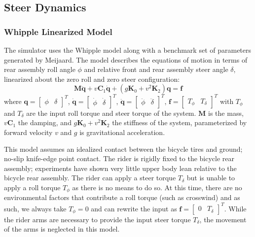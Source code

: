 \documentclass[11pt,a4paper,reqno]{amsart}
\newcommand{\mass}{\bm{M}}
\newcommand{\damping}{v \bm{C}_1}
\newcommand{\stiffness}{g \bm{K}_0 + v^2 \bm{K}_2}
\begin{document}
\subsection{Steer Dynamics} \label{sec:steer_dynamics}
\subsubsection{Whipple Linearized Model}
The simulator uses the Whipple model\cite{whipple1899} along with a benchmark set of parameters generated by
Meijaard\cite{meijaard2007}.
The model describes the equations of motion in terms of rear assembly roll angle $\phi$ and relative front and rear
assembly steer angle $\delta$, linearized about the zero roll and zero steer configuration:
\begin{equation}
    \mass \ddot{\bm{q}} + \damping \dot{\bm{q}} + (\stiffness) \bm{q} = \bm{f} \label{eq:eom}
\end{equation}
where
$ \bm{q} = \begin{bmatrix} \phi & \delta \end{bmatrix}^T $,
$ \dot{\bm{q}} = \begin{bmatrix} \dot{\phi} & \dot{\delta} \end{bmatrix}^T $,
$ \ddot{\bm{q}} = \begin{bmatrix} \ddot{\phi} & \ddot{\delta} \end{bmatrix}^T $,
$ \bm{f} = \begin{bmatrix} T_\phi & T_\delta \end{bmatrix}^T $ with $ T_\phi $ and $ T_\delta $ are the input roll
torque and steer torque of the system.
$ \mass $ is the mass, $ \damping $ the damping, and $ \stiffness $ the stiffness of the system,
parameterized by forward velocity $ v $ and $ g $ is gravitational acceleration.

This model assumes an idealized contact between the bicycle tires and ground; no-slip knife-edge point contact.
The rider is rigidly fixed to the bicycle rear assembly; experiments have shown very little upper body lean relative to
the bicycle rear assembly\cite{kooijman2009}.
The rider can apply a steer torque $ T_\delta $ but is unable to apply a roll torque $ T_\phi $ as there is no means to
do so. At this time, there are no environmental factors that contribute a roll torque (such as crosswind) and as such,
we always take $ T_\phi = 0 $ and can rewrite the input as $ \bm{f} = \begin{bmatrix} 0  & T_\delta \end{bmatrix}^T $.
While the rider arms are necessary to provide the input steer torque $ T_\delta $, the movement of the arms is
neglected in this model.
\end{document}
